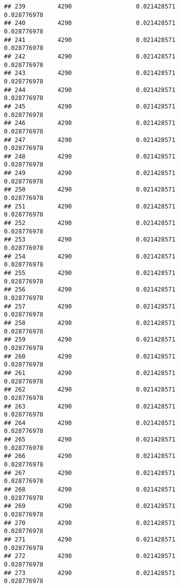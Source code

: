 \documentclass[]{article}
\begin{document}
\begin{verbatim}
## 239         4290                  0.021428571                0.028776978
## 240         4290                  0.021428571                0.028776978
## 241         4290                  0.021428571                0.028776978
## 242         4290                  0.021428571                0.028776978
## 243         4290                  0.021428571                0.028776978
## 244         4290                  0.021428571                0.028776978
## 245         4290                  0.021428571                0.028776978
## 246         4290                  0.021428571                0.028776978
## 247         4290                  0.021428571                0.028776978
## 248         4290                  0.021428571                0.028776978
## 249         4290                  0.021428571                0.028776978
## 250         4290                  0.021428571                0.028776978
## 251         4290                  0.021428571                0.028776978
## 252         4290                  0.021428571                0.028776978
## 253         4290                  0.021428571                0.028776978
## 254         4290                  0.021428571                0.028776978
## 255         4290                  0.021428571                0.028776978
## 256         4290                  0.021428571                0.028776978
## 257         4290                  0.021428571                0.028776978
## 258         4290                  0.021428571                0.028776978
## 259         4290                  0.021428571                0.028776978
## 260         4290                  0.021428571                0.028776978
## 261         4290                  0.021428571                0.028776978
## 262         4290                  0.021428571                0.028776978
## 263         4290                  0.021428571                0.028776978
## 264         4290                  0.021428571                0.028776978
## 265         4290                  0.021428571                0.028776978
## 266         4290                  0.021428571                0.028776978
## 267         4290                  0.021428571                0.028776978
## 268         4290                  0.021428571                0.028776978
## 269         4290                  0.021428571                0.028776978
## 270         4290                  0.021428571                0.028776978
## 271         4290                  0.021428571                0.028776978
## 272         4290                  0.021428571                0.028776978
## 273         4290                  0.021428571                0.028776978

\end{verbatim}
\end{document}
